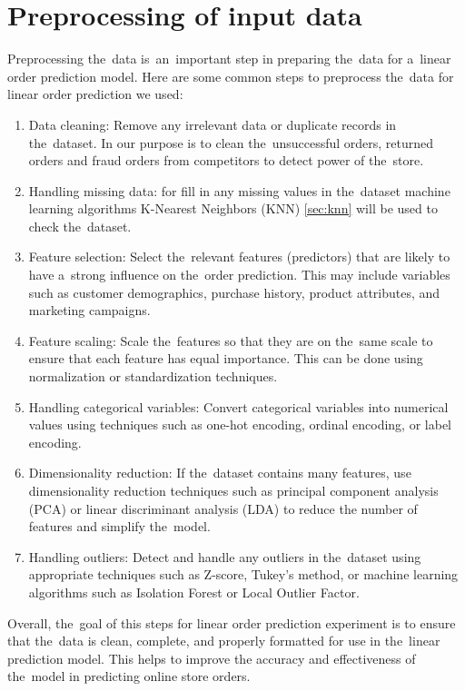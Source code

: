 \section{Preprocessing of input data}\label{subsec:preprocessing}
Preprocessing the~data is~an~important step in preparing the~data for a~linear order prediction model.
Here are some common steps to preprocess the~data for linear order prediction we used:

\begin{enumerate}
    \item Data cleaning: Remove any irrelevant data or duplicate records in the~dataset. In our purpose is to
    clean the~unsuccessful orders, returned orders and fraud orders from competitors to detect power of the~store.
    \item Handling missing data: for fill in any missing values in the~dataset machine learning algorithms
    K-Nearest Neighbors (KNN) \ref{sec:knn} will be used to check the~dataset.
    \item Feature selection: Select the~relevant features (predictors) that are likely to have a~strong
    influence on the~order prediction. This may include variables such as customer demographics, purchase
    history, product attributes, and marketing campaigns.
    \item Feature scaling: Scale the~features so that they are on the~same scale to ensure that each feature
    has equal importance. This can be done using normalization or standardization techniques.
    \item Handling categorical variables: Convert categorical variables into numerical values using techniques
    such as one-hot encoding, ordinal encoding, or label encoding.
    \item Dimensionality reduction: If the~dataset contains many features, use dimensionality reduction techniques
    such as principal component analysis (PCA) or linear discriminant analysis (LDA) to reduce the
    number of features and simplify the~model.
    \item Handling outliers: Detect and handle any outliers in the~dataset using appropriate techniques
    such as Z-score, Tukey’s method, or machine learning algorithms such as Isolation Forest or Local Outlier Factor.
\end{enumerate}
Overall, the~goal of this steps for linear order prediction experiment is to ensure that the~data is clean,
complete, and properly formatted for use in the~linear prediction model. This helps to improve the
accuracy and effectiveness of the~model in predicting online store orders.

